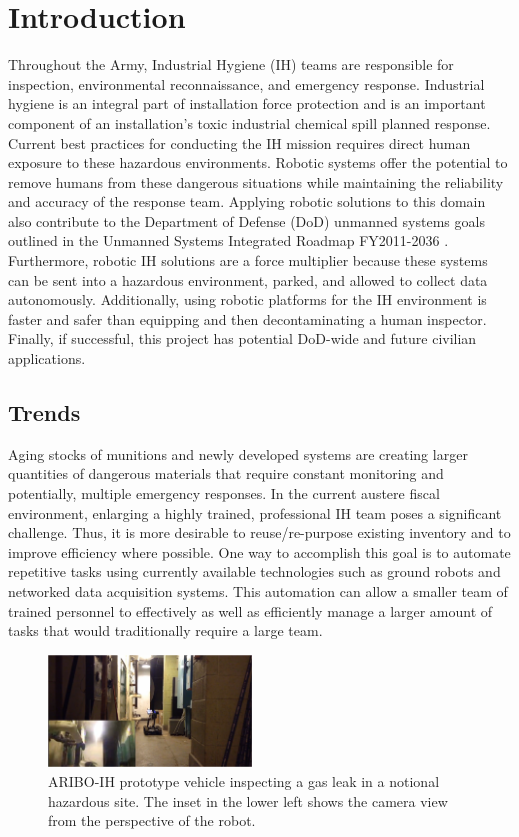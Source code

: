 \section{Introduction}\label{sec:introduction}

Throughout the Army, Industrial Hygiene (IH) teams are responsible for inspection, environmental reconnaissance, and emergency response. Industrial hygiene is an integral part of installation force protection and is an important component of an installation’s toxic industrial chemical spill planned response. Current best practices for conducting the IH mission requires direct human exposure to these hazardous environments. Robotic systems offer the potential to remove humans from these dangerous situations while maintaining the reliability and accuracy of the response team. Applying robotic solutions to this domain also contribute to the Department of Defense (DoD) unmanned systems goals outlined in the Unmanned Systems Integrated Roadmap FY2011-2036 \cite{roadmap}. Furthermore, robotic IH solutions are a force multiplier because these systems can be sent into a hazardous environment, parked, and allowed to collect data autonomously. Additionally, using robotic platforms for the IH environment is faster and safer than equipping and then decontaminating a human inspector. Finally, if successful, this project has potential DoD-wide and future civilian applications. 

\subsection{Trends}

Aging stocks of munitions and newly developed systems are creating larger quantities of dangerous materials that require constant monitoring and potentially, multiple emergency responses. In the current austere fiscal environment, enlarging a highly trained, professional IH team poses a significant challenge. Thus, it is more desirable to reuse/re-purpose existing inventory and to improve efficiency where possible.  One way to accomplish this goal is to automate repetitive tasks using currently available technologies such as ground robots and networked data acquisition systems. This automation can allow a smaller team of trained personnel to effectively as well as efficiently manage a larger amount of tasks that would traditionally require a large team.

\begin{figure}
	\centering
	\includegraphics[width=0.48\textwidth]{./pictures/concept}
	\caption{ARIBO-IH prototype vehicle inspecting a gas leak in a notional hazardous site. The inset in the lower left shows the camera view from the perspective of the robot.}
	\label{fig:concept}
\end{figure}

